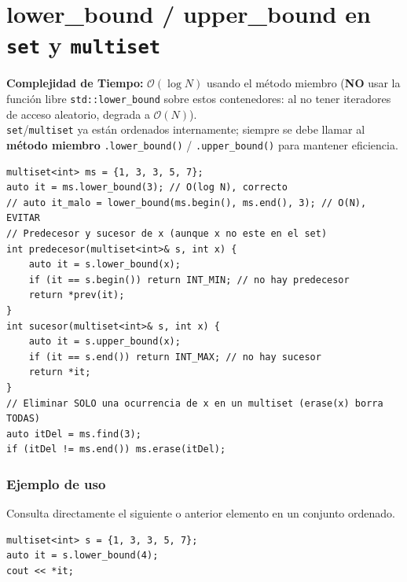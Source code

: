 \documentclass[10pt,twocolumn,letterpaper]{report}
\begin{document}
\section{lower\_bound / upper\_bound en \texttt{set} y \texttt{multiset}}
\textbf{Complejidad de Tiempo:} $\mathcal{O}(\log N)$ usando el método miembro (\textbf{NO} usar la función libre \texttt{std::lower\_bound} sobre estos contenedores: al no tener iteradores de acceso aleatorio, degrada a $\mathcal{O}(N)$). \\
\texttt{set}/\texttt{multiset} ya están ordenados internamente; siempre se debe llamar al \textbf{método miembro} \texttt{.lower\_bound()} / \texttt{.upper\_bound()} para mantener eficiencia.
\begin{lstlisting}
multiset<int> ms = {1, 3, 3, 5, 7};
auto it = ms.lower_bound(3); // O(log N), correcto
// auto it_malo = lower_bound(ms.begin(), ms.end(), 3); // O(N), EVITAR
// Predecesor y sucesor de x (aunque x no este en el set)
int predecesor(multiset<int>& s, int x) {
    auto it = s.lower_bound(x);
    if (it == s.begin()) return INT_MIN; // no hay predecesor
    return *prev(it);
}
int sucesor(multiset<int>& s, int x) {
    auto it = s.upper_bound(x);
    if (it == s.end()) return INT_MAX; // no hay sucesor
    return *it;
}
// Eliminar SOLO una ocurrencia de x en un multiset (erase(x) borra TODAS)
auto itDel = ms.find(3);
if (itDel != ms.end()) ms.erase(itDel);
\end{lstlisting}
\subsubsection*{Ejemplo de uso}
Consulta directamente el siguiente o anterior elemento en un conjunto ordenado.
\begin{lstlisting}
multiset<int> s = {1, 3, 3, 5, 7};
auto it = s.lower_bound(4);
cout << *it;
\end{lstlisting}
\end{document}
